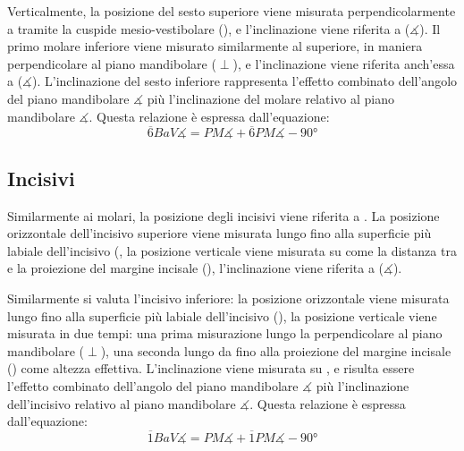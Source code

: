 Verticalmente, la posizione del sesto superiore viene misurata perpendicolarmente a  tramite la cuspide mesio-vestibolare (), e l'inclinazione viene riferita a  ($\measuredangle$). Il primo molare inferiore viene misurato similarmente al superiore, in maniera perpendicolare al piano mandibolare ($\perp$), e l'inclinazione viene riferita anch'essa a  ($\measuredangle$). L'inclinazione del sesto inferiore rappresenta l'effetto combinato dell'angolo del piano mandibolare $\measuredangle$ più l'inclinazione del molare relativo al piano mandibolare $\measuredangle$. Questa relazione è espressa dall'equazione:
\begin{equation}
\overline{6}BaV\measuredangle = PM\measuredangle + \overline{6}PM\measuredangle - 90°
\end{equation}

\subsection*{Incisivi}
Similarmente ai molari, la posizione degli incisivi viene riferita a . La posizione orizzontale dell'incisivo superiore viene misurata lungo  fino alla superficie più labiale dell'incisivo (, la posizione verticale viene misurata su  come la distanza tra  e la proiezione del margine incisale (), l'inclinazione viene riferita a  ($\measuredangle$).

Similarmente si valuta l'incisivo inferiore: la posizione orizzontale viene misurata lungo  fino alla superficie più labiale dell'incisivo (), la posizione verticale viene misurata in due tempi: una prima misurazione lungo la perpendicolare al piano mandibolare ($\perp$), una seconda lungo  da  fino alla proiezione del margine incisale () come altezza effettiva. L'inclinazione viene misurata su , e risulta essere l'effetto combinato dell'angolo del piano mandibolare $\measuredangle$ più l'inclinazione dell'incisivo relativo al piano mandibolare $\measuredangle$. Questa relazione è espressa dall'equazione:
\begin{equation}
\overline{1}BaV\measuredangle = PM\measuredangle + \overline{1}PM\measuredangle - 90°
\end{equation}

